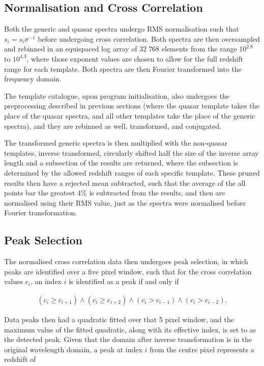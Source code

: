 \documentclass[titlesmallcaps, examinerscopy, copyrightpage]{uqthesis}
\newcommand{\brac}[1]{\left( #1 \right)}
\begin{document}
\subsection{Normalisation and Cross Correlation}

Both the generic and quasar spectra undergo RMS normalisation such that $s_i = s_i \sigma^{-1}$ before undergoing cross correlation. Both spectra are then oversampled and rebinned in an equispaced log array of $32\;768$ elements from the range $10^{2.8}$ to $10^{4.3}$, where those exponent values are chosen to allow for the full redshift range for each template. Both spectra are then Fourier transformed into the frequency domain.

The template catalogue, upon program initialisation, also undergoes the preprocessing described in previous sections (where the quasar template takes the place of the quasar spectra, and all other templates take the place of the generic spectra), and they are rebinned as well, transformed, and conjugated.

The transformed generic spectra is then multiplied with the non-quasar templates, inverse transformed, circularly shifted half the size of the inverse array length and a subsection of the results are returned, where the subsection is determined by the allowed redshift ranges of each specific template. These pruned results then have a rejected mean subtracted, such that the average of the all points bar the greatest 4\% is subtracted from the results, and then are normalised using their RMS value, just as the spectra were normalised before Fourier transformation.

\subsection{Peak Selection}

The normalised cross correlation data then undergoes peak selection, in which peaks are identified over a five pixel window, such that for the cross correlation values $c_i$, an index $i$ is identified as a peak if and only if

\begin{align}
\brac{c_i \geq c_{i+1}} \land \brac{c_i \geq c_{i+2}} \land \brac{c_i > c_{i-1}} \land \brac{c_i > c_{i-2}}.
\end{align}

Data peaks then had a quadratic fitted over that 5 pixel window, and the maximum value of the fitted quadratic, along with its effective index, is set to as the detected peak. Given that the domain after inverse transformation is in the original wavelength domain, a peak at index $i$ from the centre pixel represents a redshift of 
\end{document}
